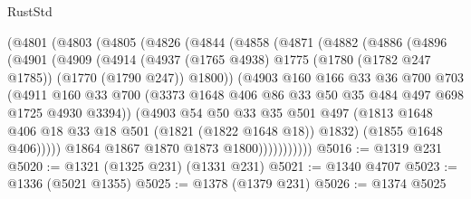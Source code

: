 \begin{lexlean}{RustStd}
\begin{coremodule}
{\begin{coremodule}
{{{{{{{{{{{{{{      (@4801
        (@4803
          (@4805
            (@4826
              (@4844
                (@4858
                  (@4871
                    (@4882
                      (@4886
                        (@4896
                          (@4901
                            (@4909
                              (@4914
                                (@4937
                                  (@1765 @4938)
                                  @1775
                                  (@1780 (@1782 @247 @1785))
                                  (@1770 (@1790 @247))
                                  @1800))
                              (@4903
                                @160
                                @166
                                @33
                                @36
                                @700
                                @703
                                (@4911
                                  @160
                                  @33
                                  @700
                                  (@3373
                                    @1648
                                    @406
                                    @86
                                    @33
                                    @50
                                    @35
                                    @484
                                    @497
                                    @698
                                    @1725
                                    @4930
                                    @3394))
                                (@4903
                                  @54
                                  @50
                                  @33
                                  @35
                                  @501
                                  @497
                                  (@1813
                                    @1648
                                    @406
                                    @18
                                    @33
                                    @18
                                    @501
                                    (@1821 (@1822 @1648 @18))
                                    @1832)
                                  (@1855 @1648 @406)))))
                          @1864
                          @1867
                          @1870
                          @1873
                          @1800)))))))))))
@5016 := @1319 @231
@5020 := @1321 (@1325 @231) (@1331 @231)
@5021 := @1340 @4707
@5023 := @1336 (@5021 @1355)
@5025 := @1378 (@1379 @231)
@5026 := @1374 @5025
}}}}}}}}}}}}}}
\end{coremodule}}
\end{coremodule}
\end{lexlean}
